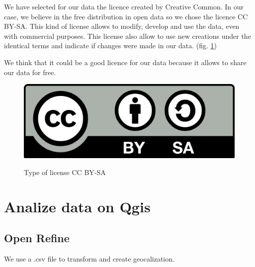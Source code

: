 \documentclass[10pt,a4paper]{article}
\begin{document}
We have selected for our data the licence created by Creative Common. In our case, we believe in the free distribution in open data so we chose the licence CC BY-SA. This kind of license allows to modify, develop and use the data, even with commercial purposes. This license also allow to use new creations under the identical terms and indicate if changes were made in our data. (fig. \ref{licence})

We think that it could be a good licence for our data because it allows to share our data for free. 

\begin{figure}[hdp]
\centering
\includegraphics[scale=0.15]{licence.png}
\label{licence}
\caption{Type of license CC BY-SA}
\end{figure}


\section{Analize data on Qgis}

\subsection{Open Refine}

We use a .csv file to transform and create geocalization.
\end{document}
